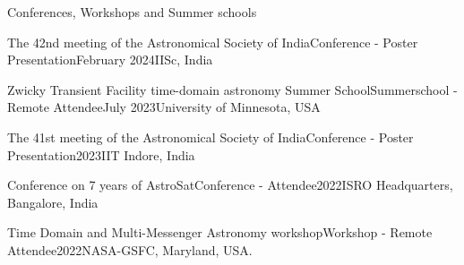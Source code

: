 \begin{section}{Conferences, Workshops and Summer schools}

    \begin{subsectionnobullet1}{The 42nd meeting of the Astronomical Society of India}{Conference - Poster Presentation}{February 2024}{IISc, India}

    \end{subsectionnobullet1}
     \vspace{-0.5em}

    \begin{subsectionnobullet1}{Zwicky Transient Facility time-domain astronomy Summer School}{Summerschool - Remote Attendee}{July 2023}{University of Minnesota, USA}

    \end{subsectionnobullet1}
     \vspace{-0.5em}
    \begin{subsectionnobullet1}{The 41st meeting of the Astronomical Society of India}{Conference - Poster Presentation}{2023}{IIT Indore, India}

    \end{subsectionnobullet1}
    \vspace{-0.5em}
    \begin{subsectionnobullet1}{Conference on 7 years of AstroSat}{Conference - Attendee}{2022}{ISRO Headquarters, Bangalore, India}
    \end{subsectionnobullet1}
    \vspace{-0.5em}  
    \begin{subsectionnobullet1}{Time Domain and Multi-Messenger Astronomy workshop}{Workshop - Remote Attendee}{2022}{NASA-GSFC, Maryland, USA.}
    \end{subsectionnobullet1}
    

    
    
\end{section}

